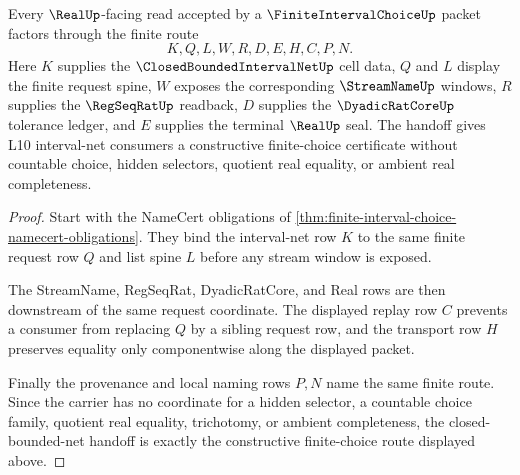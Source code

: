 \begin{theorem}
\label{thm:finite-interval-choice-closed-bounded-net-handoff}
Every $\RealUp$-facing read accepted by a $\FiniteIntervalChoiceUp$ packet factors through the finite route
$$
K,Q,L,W,R,D,E,H,C,P,N.
$$
Here $K$ supplies the $\ClosedBoundedIntervalNetUp$ cell data, $Q$ and $L$ display the finite request spine, $W$ exposes the corresponding $\StreamNameUp$ windows, $R$ supplies the $\RegSeqRatUp$ readback, $D$ supplies the $\DyadicRatCoreUp$ tolerance ledger, and $E$ supplies the terminal $\RealUp$ seal. The handoff gives L10 interval-net consumers a constructive finite-choice certificate without countable choice, hidden selectors, quotient real equality, or ambient real completeness.
\end{theorem}
\begin{proof}
Start with the NameCert obligations of \autoref{thm:finite-interval-choice-namecert-obligations}. They bind the interval-net row $K$ to the same finite request row $Q$ and list spine $L$ before any stream window is exposed.

The StreamName, RegSeqRat, DyadicRatCore, and Real rows are then downstream of the same request coordinate. The displayed replay row $C$ prevents a consumer from replacing $Q$ by a sibling request row, and the transport row $H$ preserves equality only componentwise along the displayed packet.

Finally the provenance and local naming rows $P,N$ name the same finite route. Since the carrier has no coordinate for a hidden selector, a countable choice family, quotient real equality, trichotomy, or ambient completeness, the closed-bounded-net handoff is exactly the constructive finite-choice route displayed above.
\end{proof}



